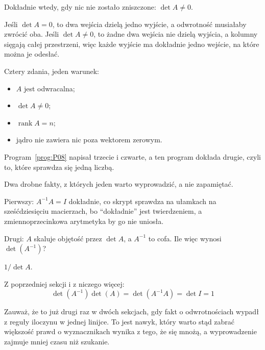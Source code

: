 \begin{fr}
\begin{ansblock}
Dokładnie wtedy, gdy nic nie zostało zniszczone: $\det A \ne 0$.
\end{ansblock}

Jeśli $\det A = 0$, to dwa wejścia dzielą jedno wyjście, a odwrotność musiałaby
zwrócić oba. Jeśli $\det A \ne 0$, to żadne dwa wejścia nie dzielą wyjścia, a
kolumny sięgają całej przestrzeni, więc każde wyjście ma dokładnie jedno
wejście, na które można je odesłać.

Cztery zdania, jeden warunek:

\begin{itemize}
\item $A$ jest odwracalna;
\item $\det A \ne 0$;
\item $\operatorname{rank} A = n$;
\item jądro nie zawiera nic poza wektorem zerowym.
\end{itemize}

Program~\ref{prog:P08} napisał trzecie i czwarte, a ten program dokłada drugie,
czyli to, które sprawdza się jedną liczbą.
\end{fr}

\begin{fr}
Dwa drobne fakty, z których jeden warto wyprowadzić, a nie zapamiętać.

Pierwszy: $A^{-1}A = I$ dokładnie, co skrypt sprawdza na ułamkach na
sześćdziesięciu macierzach, bo \enquote{dokładnie} jest twierdzeniem, a
zmiennoprzecinkowa arytmetyka by go nie uniosła.

Drugi: $A$ skaluje objętość przez $\det A$, a $A^{-1}$ to cofa. Ile więc wynosi
$\det(A^{-1})$?
\dotline
\nextframe
\end{fr}

\begin{fr}
\begin{ansblock}
$1/\det A$.
\end{ansblock}

Z poprzedniej sekcji i z niczego więcej:
\[ \det(A^{-1})\det(A) = \det(A^{-1}A) = \det I = 1 \]

Zauważ, że to już drugi raz w dwóch sekcjach, gdy fakt o odwrotnościach wypadł
z reguły iloczynu w jednej linijce. To jest nawyk, który warto stąd zabrać
\dash{} większość prawd o wyznacznikach wynika z tego, że się mnożą, a
wyprowadzenie zajmuje mniej czasu niż szukanie.
\end{fr}

